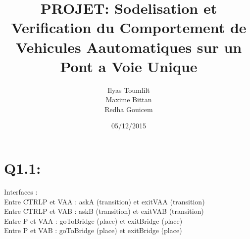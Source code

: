 \documentclass[a4paper, 11pt]{article}
\begin{document}
 
\title{PROJET: Sodelisation et Verification du Comportement de Vehicules Aautomatiques sur un Pont a Voie Unique}
\author{Ilyas Toumlilt\\Maxime Bittan\\Redha Gouicem}
\date{05/12/2015}
 
\maketitle

\section{Q1.1:}
Interfaces :\\
Entre CTRLP et VAA : askA (transition) et exitVAA (transition)\\
Entre CTRLP et VAB : askB (transition) et exitVAB (transition)\\
Entre P et VAA : goToBridge (place) et exitBridge (place)\\
Entre P et VAB : goToBridge (place) et exitBridge (place)\\
\end{document}
